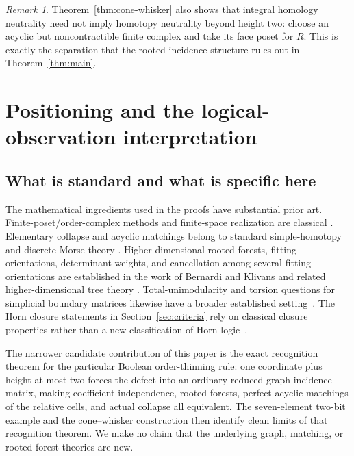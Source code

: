 \documentclass[11pt]{article}
\theoremstyle{definition}
\theoremstyle{remark}
\newtheorem{remark}[theorem]{Remark}
\begin{document}
\begin{remark}
Theorem~\ref{thm:cone-whisker} also shows that integral homology neutrality need not
imply homotopy neutrality beyond height two: choose an acyclic but noncontractible
finite complex and take its face poset for $R$.  This is exactly the separation that
the rooted incidence structure rules out in Theorem~\ref{thm:main}.
\end{remark}

\section{Positioning and the logical-observation interpretation}\label{sec:logical}

\subsection{What is standard and what is specific here}

The mathematical ingredients used in the proofs have substantial prior art.
Finite-poset/order-complex methods and finite-space realization are classical
\cite{McCord1966,Barmak2011A,BarmakBook}.  Elementary collapse and acyclic matchings
belong to standard simple-homotopy and discrete-Morse theory
\cite{Forman1998,Kozlov2008}.  Higher-dimensional rooted forests, fitting orientations,
determinant weights, and cancellation among several fitting orientations are established
in the work of Bernardi and Klivans and related higher-dimensional tree theory
\cite{BernardiKlivans2016,DuvalKlivansMartin2016}.  Total-unimodularity and torsion
questions for simplicial boundary matrices likewise have a broader established
setting~\cite{DeyHiraniKrishnamoorthy2011}.  The Horn closure statements in
Section~\ref{sec:criteria} rely on classical closure properties rather than a new
classification of Horn logic~\cite{JeavonsCohenGyssens1997,Wild2017}.

The narrower candidate contribution of this paper is the exact recognition theorem
for the particular Boolean order-thinning rule: one coordinate plus height at most two
forces the defect into an ordinary reduced graph-incidence matrix, making coefficient
independence, rooted forests, perfect acyclic matchings of the relative cells, and actual collapse
all equivalent.  The seven-element two-bit example and the cone--whisker construction
then identify clean limits of that recognition theorem.  We make no claim that the
underlying graph, matching, or rooted-forest theories are new.
\end{document}
